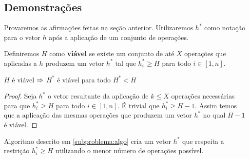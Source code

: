 \subsection*{Demonstrações}

Provaremos as afirmações feitas na seção anterior. Utilizaremos $h^*$ como notação para o vetor $h$ após a aplicação de um conjunto de operações.

Definiremos $H$ como \textbf{viável} se existe um conjunto de até $X$ operações que aplicadas a $h$ produzem um vetor $h^*$ tal que $h^*_i \geq H$ para todo $i \in [1, n]$.

\begin{prop}
    $H$ é viável $\Rightarrow$ $H^*$ é viável para todo $H^* < H$
\end{prop}

\begin{proof}
    Seja $h^*$ o vetor resultante da aplicação de $k \leq X$ operações necessárias para que $h^*_i \geq H$ para todo $i \in [1, n]$. É trivial que $h^*_i \geq H - 1$. Assim temos que a aplicação das mesmas operações que produzem um vetor $h^*$ no qual $H - 1$ é viável.
\end{proof}

\begin{prop}
    Algoritmo descrito em \ref{subproblema:algo} cria um vetor $h^*$ que respeita a restrição $h^*_i \geq H$ utilizando o menor número de operações possível.
\end{prop}

